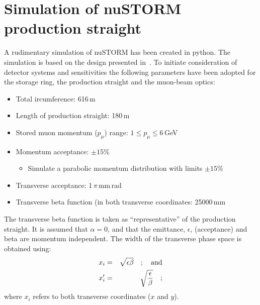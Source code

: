 \newcommand{\dataFormat}{ \noindent \begin{tabular}{|  l | r | c | p{10.0cm} | } \hline Branch: sub-branch & Variable   &  Type  &   Description\\  \hline }
\newcommand{\info}[4]{ {#1}  & {#2}  & {#3} & {#4} \\}
\newcommand{\dataFormatEnd} { \hline \end{tabular}  \nl}
\newcommand{\nl}{\hfill\newline}

\section{Simulation of nuSTORM production straight}
A rudimentary simulation of nuSTORM has been created in python.
The simulation is based on the design presented in~\cite{Ahdida:2020whw}.
To initiate consideration of detector systems and sensitivities the
following parameters have been adopted for the storage ring, the
production straight and the muon-beam optics:
\begin{itemize}
  \item Total ircumference: 616\,m
  \item Length of production straight: 180\,m
  \item Stored muon momentum ($p_\mu$) range: $1 \le p_\mu \le 6$\,GeV
  \item Momentum acceptance: $\pm 15$\%
    \begin{itemize}
      \item Simulate a parabolic momentum distribution with limits
        $\pm 15$\%
    \end{itemize}
  \item Transverse acceptance: 1\,$\pi$\,mm\,rad
  \item Transverse beta function (in both transverse coordinates: 25000\,mm
\end{itemize}
The transverse beta function is taken as “representative” of the
production straight.
It is assumed that $\alpha=0$, and that the emittance, $\epsilon$,
(acceptance) and beta are momentum independent. 
The width of the transverse phase space is obtained using:
\begin{eqnarray}
  x_i        & = & \sqrt{\epsilon \beta} \quad {\rm ; \quad and} \nonumber \\
  x_i^\prime  & = & \sqrt{\frac{\epsilon}{\beta}} \quad ;  \nonumber
\end{eqnarray}
where $x_i$ refers to both transverse coordinates ($x$ and $y$).

